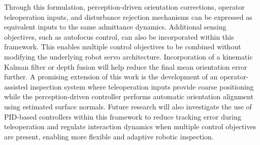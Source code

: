 \documentclass[journal]{IEEEtran}
\begin{document}
Through this formulation, perception-driven orientation corrections, operator teleoperation inputs, and disturbance rejection mechanisms can be expressed as equivalent inputs to the same admittance dynamics. Additional sensing objectives, such as autofocus control, can also be incorporated within this framework. This enables multiple control objectives to be combined without modifying the underlying robot servo architecture.
Incorporation of a kinematic Kalman filter or depth fusion will help reduce the final mean orientation error further.
A promising extension of this work is the development of an operator-assisted inspection system where teleoperation inputs provide coarse positioning while the perception-driven controller performs automatic orientation alignment using estimated surface normals. Future research will also investigate the use of PID-based controllers within this framework to reduce tracking error during teleoperation and regulate interaction dynamics when multiple control objectives are present, enabling more flexible and adaptive robotic inspection.


%
%

\end{document}
